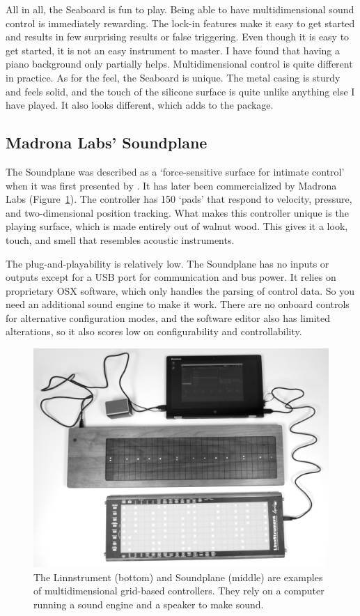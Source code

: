 All in all, the Seaboard is fun to play. Being able to have multidimensional sound control is immediately rewarding. The lock-in features make it easy to get started and results in few surprising results or false triggering. Even though it is easy to get started, it is not an easy instrument to master. I have found that having a piano background only partially helps. Multidimensional control is quite different in practice. As for the feel, the Seaboard is unique. The metal casing is sturdy and feels solid, and the touch of the silicone surface is quite unlike anything else I have played. It also looks different, which adds to the package.


\subsection{Madrona Labs' Soundplane}

The Soundplane was described as a `force-sensitive surface for intimate control' when it was first presented by \citet{jones_force-sensitive_2009}. It has later been commercialized by Madrona Labs (Figure~\ref{fig:soundplane}). The controller has 150 `pads' that respond to velocity, pressure, and two-dimensional position tracking. What makes this controller unique is the playing surface, which is made entirely out of walnut wood. This gives it a look, touch, and smell that resembles acoustic instruments.

The plug-and-playability is relatively low. The Soundplane has no inputs or outputs except for a USB port for communication and bus power. It relies on proprietary OSX software, which only handles the parsing of control data. So you need an additional sound engine to make it work. There are no onboard controls for alternative configuration modes, and the software editor also has limited alterations, so it also scores low on configurability and controllability.

\begin{figure}[tbp]
		\includegraphics[width=1\columnwidth]{figures/64-linnstrument-soundplane.jpg}
	\caption{The Linnstrument (bottom) and Soundplane (middle) are examples of multidimensional grid-based controllers. They rely on a computer running a sound engine and a speaker to make sound.}
	\label{fig:soundplane}
\end{figure}


